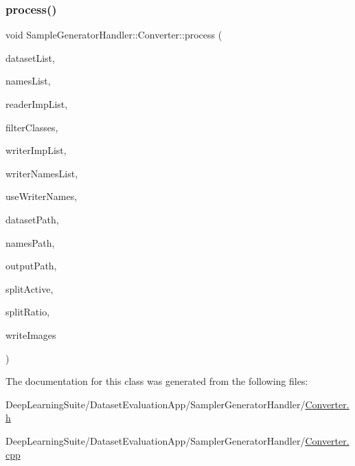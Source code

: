 \subsubsection{\texorpdfstring{process()}{process()}}
{\footnotesize\ttfamily void Sample\+Generator\+Handler\+::\+Converter\+::process (\begin{DoxyParamCaption}\item[{Q\+List\+View $\ast$}]{dataset\+List,  }\item[{Q\+List\+View $\ast$}]{names\+List,  }\item[{Q\+List\+View $\ast$}]{reader\+Imp\+List,  }\item[{Q\+List\+View $\ast$}]{filter\+Classes,  }\item[{Q\+List\+View $\ast$}]{writer\+Imp\+List,  }\item[{Q\+List\+View $\ast$}]{writer\+Names\+List,  }\item[{bool}]{use\+Writer\+Names,  }\item[{const std\+::string \&}]{dataset\+Path,  }\item[{const std\+::string \&}]{names\+Path,  }\item[{const std\+::string \&}]{output\+Path,  }\item[{bool}]{split\+Active,  }\item[{double}]{split\+Ratio,  }\item[{bool}]{write\+Images }\end{DoxyParamCaption})\hspace{0.3cm}{\ttfamily [static]}}



The documentation for this class was generated from the following files\+:\begin{DoxyCompactItemize}
\item 
Deep\+Learning\+Suite/\+Dataset\+Evaluation\+App/\+Sampler\+Generator\+Handler/\hyperlink{_converter_8h}{Converter.\+h}\item 
Deep\+Learning\+Suite/\+Dataset\+Evaluation\+App/\+Sampler\+Generator\+Handler/\hyperlink{_dataset_evaluation_app_2_sampler_generator_handler_2_converter_8cpp}{Converter.\+cpp}\end{DoxyCompactItemize}
